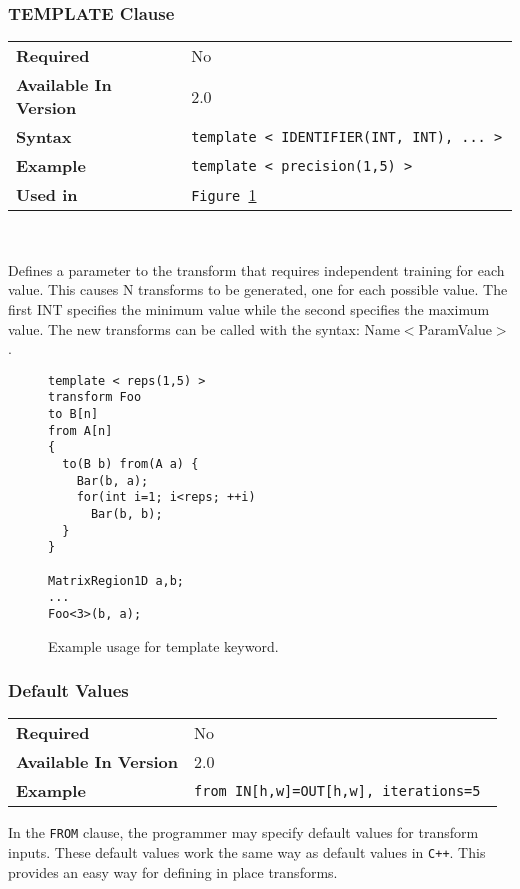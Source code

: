 \documentclass[11pt]{article}
\begin{document}
\subsubsection{TEMPLATE Clause}


\begin{tabular}{| l | l |}
\hline
\bf Required & No \\
\bf Available In Version & 2.0            \\
\bf Syntax & \tt template < IDENTIFIER(INT, INT), ... > \\
\bf Example & \tt template < precision(1,5) > \\
\bf Used in & \tt Figure~\ref{ex5}      \\
\hline
\end{tabular}

~

\noindent Defines a parameter to the transform that requires independent
training for each value.  This causes N transforms to be generated, one for
each possible value.  The first INT specifies the minimum value while the
second specifies the maximum value.  The new transforms can be called with
the syntax: Name$<$ParamValue$>$.

\begin{figure}[h]
\begin{lstlisting}
template < reps(1,5) >
transform Foo
to B[n]
from A[n]
{
  to(B b) from(A a) {
    Bar(b, a);  
    for(int i=1; i<reps; ++i)
      Bar(b, b);
  }
}

MatrixRegion1D a,b;
...
Foo<3>(b, a);
\end{lstlisting}
\caption{
Example usage for template keyword.
\label{ex5}
}
\end{figure}

\subsubsection{Default Values}

\begin{tabular}{| l | l |}
\hline
\bf Required & No \\
\bf Available In Version & 2.0            \\
\bf Example & \tt from IN[h,w]=OUT[h,w], iterations=5 \\
\hline
\end{tabular}

In the {\tt FROM} clause, the programmer may specify default values for transform inputs.
These default values work the same way as default values in {\tt C++}.  This provides an easy way for defining in place transforms.
\end{document}
